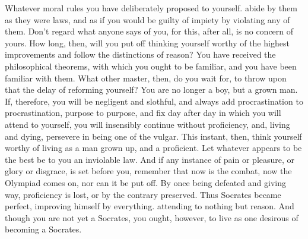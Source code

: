Whatever moral rules you have deliberately proposed to yourself.
abide by them as they were laws, and as if you would be guilty of
impiety by violating any of them. Don't regard what anyone says of
you, for this, after all, is no concern of yours. How long, then,
will you put off thinking yourself worthy of the highest improvements
and follow the distinctions of reason? You have received the philosophical
theorems, with which you ought to be familiar, and you have been familiar
with them. What other master, then, do you wait for, to throw upon
that the delay of reforming yourself? You are no longer a boy, but
a grown man. If, therefore, you will be negligent and slothful, and
always add procrastination to procrastination, purpose to purpose,
and fix day after day in which you will attend to yourself, you will
insensibly continue without proficiency, and, living and dying, persevere
in being one of the vulgar. This instant, then, think yourself worthy
of living as a man grown up, and a proficient. Let whatever appears
to be the best be to you an inviolable law. And if any instance of
pain or pleasure, or glory or disgrace, is set before you, remember
that now is the combat, now the Olympiad comes on, nor can it be put
off. By once being defeated and giving way, proficiency is lost, or
by the contrary preserved. Thus Socrates became perfect, improving
himself by everything. attending to nothing but reason. And though
you are not yet a Socrates, you ought, however, to live as one desirous
of becoming a Socrates. 

